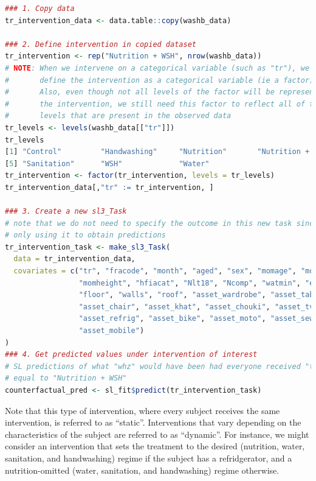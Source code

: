 \documentclass[
  12pt, krantz2,
]{krantz}
\newcommand{\1}{\mathbbm{1}}
\theoremstyle{definition}
\theoremstyle{definition}
\theoremstyle{definition}
\theoremstyle{definition}
\theoremstyle{remark}
\begin{document}
\begin{lstlisting}[language=R]
### 1. Copy data
tr_intervention_data <- data.table::copy(washb_data) 

### 2. Define intervention in copied dataset
tr_intervention <- rep("Nutrition + WSH", nrow(washb_data))
# NOTE: When we intervene on a categorical variable (such as "tr"), we need to 
#       define the intervention as a categorical variable (ie a factor).
#       Also, even though not all levels of the factor will be represented in 
#       the intervention, we still need this factor to reflect all of the 
#       levels that are present in the observed data
tr_levels <- levels(washb_data[["tr"]])
tr_levels
[1] "Control"         "Handwashing"     "Nutrition"       "Nutrition + WSH"
[5] "Sanitation"      "WSH"             "Water"          
tr_intervention <- factor(tr_intervention, levels = tr_levels)
tr_intervention_data[,"tr" := tr_intervention, ]

### 3. Create a new sl3_Task
# note that we do not need to specify the outcome in this new task since we are 
# only using it to obtain predictions
tr_intervention_task <- make_sl3_Task(
  data = tr_intervention_data, 
  covariates = c("tr", "fracode", "month", "aged", "sex", "momage", "momedu", 
                 "momheight", "hfiacat", "Nlt18", "Ncomp", "watmin", "elec", 
                 "floor", "walls", "roof", "asset_wardrobe", "asset_table", 
                 "asset_chair", "asset_khat", "asset_chouki", "asset_tv", 
                 "asset_refrig", "asset_bike", "asset_moto", "asset_sewmach", 
                 "asset_mobile")
)
### 4. Get predicted values under intervention of interest
# SL predictions of what "whz" would have been had everyone received "tr" 
# equal to "Nutrition + WSH"
counterfactual_pred <- sl_fit$predict(tr_intervention_task)
\end{lstlisting}

Note that this type of intervention, where every subject receives the same
intervention, is referred to as ``static''. Interventions that vary depending on
the characteristics of the subject are referred to as ``dynamic''. For instance,
we might consider an intervention that sets the treatment to the desired
(nutrition, water, sanitation, and handwashing) regime if the subject has
a refridgerator, and a nutrition-omitted (water, sanitation, and handwashing)
regime otherwise.
\end{document}
